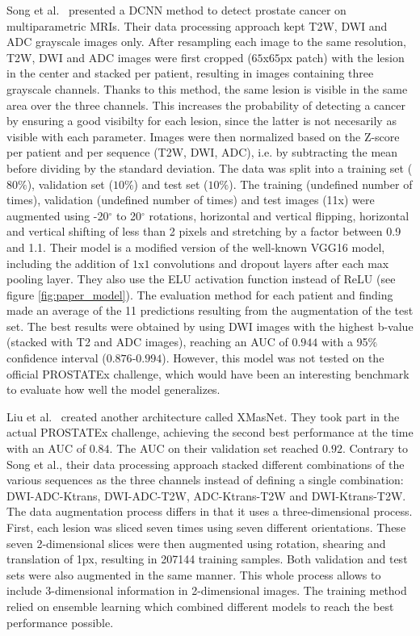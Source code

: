 Song et al.~\cite{07} presented a DCNN method to detect prostate cancer on multiparametric MRIs. Their data processing approach kept T2W, DWI and ADC grayscale images only. After resampling each image to the same resolution, T2W, DWI and ADC images were first cropped ($65$x$65$px patch) with the lesion in the center and stacked per patient, resulting in images containing three grayscale channels. Thanks to this method, the same lesion is visible in the same area over the three channels. This increases the probability of detecting a cancer by ensuring a good visibilty for each lesion, since the latter is not necesarily as visible with each parameter. Images were then normalized based on the Z-score per patient and per sequence (T2W, DWI, ADC), i.e. by subtracting the mean before dividing by the standard deviation. The data was split into a training set ($80\%$), validation set ($10\%$) and test set ($10\%$). The training (undefined number of times), validation (undefined number of times) and test images (11x) were augmented using -20$^\circ$ to 20$^\circ$ rotations, horizontal and vertical flipping, horizontal and vertical shifting of less than 2 pixels and stretching by a factor between 0.9 and 1.1.
Their model is a modified version of the well-known VGG16 model, including the addition of $1$x$1$ convolutions and dropout layers after each max pooling layer. They also use the ELU activation function instead of ReLU (see figure \ref{fig:paper_model}). The evaluation method for each patient and finding made an average of the 11 predictions resulting from the augmentation of the test set. The best results were obtained by using DWI images with the highest b-value (stacked with T2 and ADC images), reaching an AUC of $0.944$ with a 95$\%$ confidence interval ($0.876$-$0.994$). However, this model was not tested on the official PROSTATEx challenge, which would have been an interesting benchmark to evaluate how well the model generalizes.

Liu et al.~\cite{46} created another architecture called XMasNet. They took part in the actual PROSTATEx challenge, achieving the second best performance at the time with an AUC of $0.84$. The AUC on their validation set reached $0.92$. Contrary to Song et al., their data processing approach stacked different combinations of the various sequences as the three channels instead of defining a single combination: DWI-ADC-Ktrans, DWI-ADC-T2W, ADC-Ktrans-T2W and DWI-Ktrans-T2W. The data augmentation process differs in that it uses a three-dimensional process. First, each lesion was sliced seven times using seven different orientations. These seven 2-dimensional slices were then augmented using rotation, shearing and translation of 1px, resulting in 207144 training samples. Both validation and test sets were also augmented in the same manner. This whole process allows to include 3-dimensional information in 2-dimensional images. The training method relied on ensemble learning which combined different models to reach the best performance possible.

